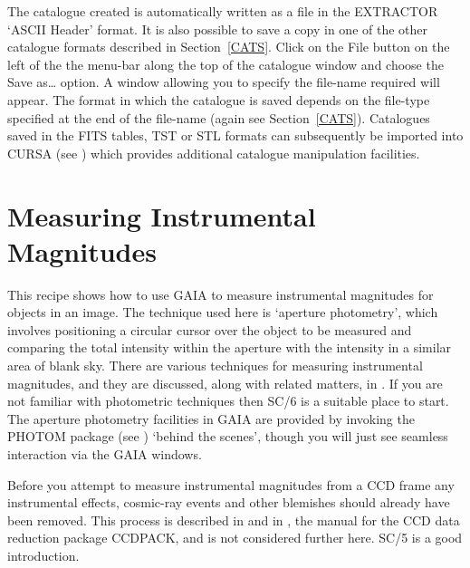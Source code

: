 \documentclass[twoside,11pt]{starlink}
\begin{document}
\begin{enumerate}
   The catalogue created is automatically written as a file in the
   EXTRACTOR `ASCII Header' format.  It is also possible to save a copy
   in one of the other catalogue formats described in Section~\ref{CATS}.
   Click on the \textsf{File} button on the left of the the menu-bar along
   the top of the catalogue window and choose the \textsf{Save as\ldots}
   option.  A window allowing you to specify the file-name required will
   appear.  The format in which the catalogue is saved depends on the
   file-type specified at the end of the file-name (again see
   Section~\ref{CATS}).  Catalogues saved in the FITS tables, TST or STL
   formats can subsequently be imported into CURSA (see
   \cite{SUN190}) which provides additional
   catalogue manipulation facilities.

\end{enumerate}


\newpage
\section{\label{PHOTOM_RECIP}Measuring Instrumental
Magnitudes}

This recipe shows how to use GAIA to measure instrumental magnitudes for
objects in an image.  The technique used here is `aperture photometry',
which involves positioning a circular cursor over the object to be
measured and comparing the total intensity within the aperture with the
intensity in a similar area of blank sky.  There are various techniques
for measuring instrumental magnitudes, and they are discussed, along with
related matters, in \/\cite{SC6}.  If you are not familiar with photometric
techniques then SC/6 is a suitable place to start.  The aperture photometry
facilities in GAIA are provided by invoking the PHOTOM package (see
\cite{SUN45}) `behind the scenes', though you will
just see seamless interaction via the GAIA windows.

Before you attempt to measure instrumental magnitudes from a CCD frame
any instrumental effects, cosmic-ray events and other blemishes should
already have been removed.  This process is described in \/\cite{SC5} and in
\cite{SUN139}, the manual for the CCD data
reduction package CCDPACK, and is not considered further here.  SC/5 is
a good introduction.
\end{document}
